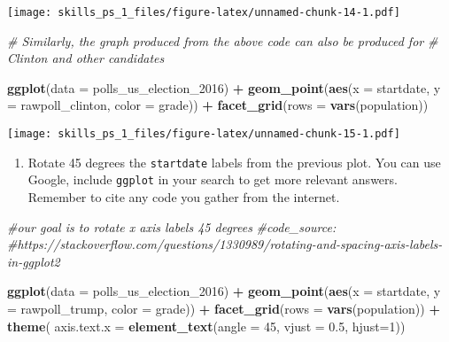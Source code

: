 \documentclass[
]{article}
\newenvironment{Shaded}{\begin{snugshade}}{\end{snugshade}}
\newcommand{\CommentTok}[1]{\textcolor[rgb]{0.56,0.35,0.01}{\textit{#1}}}
\newcommand{\DataTypeTok}[1]{\textcolor[rgb]{0.13,0.29,0.53}{#1}}
\newcommand{\DecValTok}[1]{\textcolor[rgb]{0.00,0.00,0.81}{#1}}
\newcommand{\FloatTok}[1]{\textcolor[rgb]{0.00,0.00,0.81}{#1}}
\newcommand{\KeywordTok}[1]{\textcolor[rgb]{0.13,0.29,0.53}{\textbf{#1}}}
\newcommand{\NormalTok}[1]{#1}
\newcommand{\OperatorTok}[1]{\textcolor[rgb]{0.81,0.36,0.00}{\textbf{#1}}}
\newcommand{\StringTok}[1]{\textcolor[rgb]{0.31,0.60,0.02}{#1}}
\providecommand{\tightlist}{%
  \setlength{\itemsep}{0pt}\setlength{\parskip}{0pt}}
\begin{document}
\texttt{[image: skills\_ps\_1\_files/figure-latex/unnamed-chunk-14-1.pdf]}

\begin{Shaded}
\begin{Highlighting}[]
\CommentTok{# Similarly, the graph produced from the above code can also be produced for }
    \CommentTok{# Clinton and other candidates}
    
        \KeywordTok{ggplot}\NormalTok{(}\DataTypeTok{data =}\NormalTok{ polls_us_election_}\DecValTok{2016}\NormalTok{) }\OperatorTok{+}
\StringTok{      }\KeywordTok{geom_point}\NormalTok{(}\KeywordTok{aes}\NormalTok{(}\DataTypeTok{x =}\NormalTok{ startdate, }
                     \DataTypeTok{y =}\NormalTok{ rawpoll_clinton, }
                     \DataTypeTok{color =}\NormalTok{ grade)) }\OperatorTok{+}
\StringTok{      }\KeywordTok{facet_grid}\NormalTok{(}\DataTypeTok{rows =} \KeywordTok{vars}\NormalTok{(population))}
\end{Highlighting}
\end{Shaded}

\texttt{[image: skills\_ps\_1\_files/figure-latex/unnamed-chunk-15-1.pdf]}

\begin{enumerate}
\def\labelenumi{\arabic{enumi}.}
\tightlist
\item
  Rotate 45 degrees the \texttt{startdate} labels from the previous
  plot. You can use Google, include \texttt{ggplot} in your search to
  get more relevant answers. Remember to cite any code you gather from
  the internet.
\end{enumerate}

\begin{Shaded}
\begin{Highlighting}[]
\CommentTok{#our goal is to rotate x axis labels 45 degrees}
\CommentTok{#code_source: }
\CommentTok{#https://stackoverflow.com/questions/1330989/rotating-and-spacing-axis-labels-in-ggplot2}

    \KeywordTok{ggplot}\NormalTok{(}\DataTypeTok{data =}\NormalTok{ polls_us_election_}\DecValTok{2016}\NormalTok{) }\OperatorTok{+}
\StringTok{      }\KeywordTok{geom_point}\NormalTok{(}\KeywordTok{aes}\NormalTok{(}\DataTypeTok{x =}\NormalTok{ startdate, }
                     \DataTypeTok{y =}\NormalTok{ rawpoll_trump, }
                     \DataTypeTok{color =}\NormalTok{ grade)) }\OperatorTok{+}
\StringTok{      }\KeywordTok{facet_grid}\NormalTok{(}\DataTypeTok{rows =} \KeywordTok{vars}\NormalTok{(population)) }\OperatorTok{+}\StringTok{ }\KeywordTok{theme}\NormalTok{(}
        \DataTypeTok{axis.text.x =} \KeywordTok{element_text}\NormalTok{(}\DataTypeTok{angle =} \DecValTok{45}\NormalTok{, }\DataTypeTok{vjust =} \FloatTok{0.5}\NormalTok{, }\DataTypeTok{hjust=}\DecValTok{1}\NormalTok{))}
\end{Highlighting}
\end{Shaded}
\end{document}
